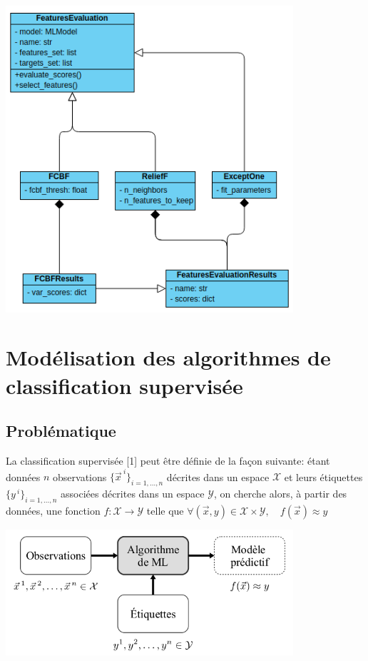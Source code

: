 \begin{center}
\includegraphics[width=0.8\textwidth]{figures/diagramme_classe_select.png}
\label{fig14}
\end{center}

\chapter{Modélisation des algorithmes de classification supervisée}
\clearpage
\section{Problématique}

La classification supervisée [1] peut être définie de la façon suivante: étant données $n$ observations $\lbrace\vec{x}^{\:i}\rbrace_{i=1,...,n}$ décrites dans un espace $\mathcal{X}$ et leurs étiquettes $\lbrace y^{\:i}\rbrace_{i=1,...,n}$ associées décrites dans un espace $\mathcal{Y}$, on cherche alors, à partir des données, une fonction $f:\mathcal{X}\rightarrow\mathcal{Y}$ telle que $\forall(\vec{x},y)\in \mathcal{X}\times\mathcal{Y},\quad f(\vec{x})\approx y$

\begin{center}
\includegraphics[width=0.8\textwidth]{figures/apprentissage_supervise.png}
\label{fig3}
\end{center}

